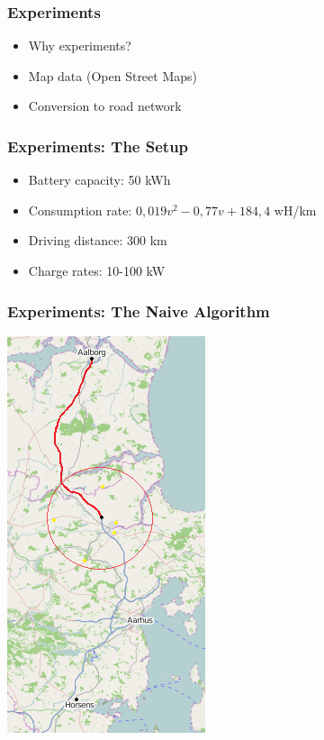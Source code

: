 \begin{frame}
  \frametitle{Experiments}
  \begin{itemize}
  	\item Why experiments?
  	\item Map data (Open Street Maps)
  	\item Conversion to road network
  \end{itemize}
\end{frame}

\begin{frame}
  \frametitle{Experiments: The Setup} 
  \begin{itemize}
  	\item Battery capacity: 50 kWh
  	\item Consumption rate: $0,019v^2 - 0,77v + 184,4$ wH/km
  	\item Driving distance: 300 km
  	\item Charge rates: 10-100 kW
  \end{itemize}
\end{frame}

\begin{frame}
  \frametitle{Experiments: The Naive Algorithm}
  \begin{center}
	  \includegraphics[scale=0.6]{images/AalborgtoHorsens1}  
  \end{center}
\end{frame}

